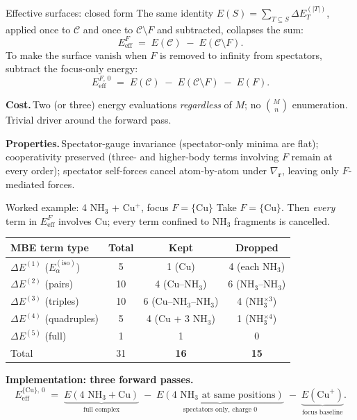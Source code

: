 \documentclass[aspectratio=169,11pt]{beamer}
\newcommand{\Eiso}{E^{(\mathrm{iso})}}
\begin{document}
\begin{frame}{Effective surfaces: closed form}
\small
The same identity $E(S)=\sum_{T\subseteq S}\Delta E^{(|T|)}_T$, applied once
to $\mathcal{C}$ and once to $\mathcal{C}\setminus F$ and subtracted,
collapses the sum:
\[
\boxed{\;E_{\mathrm{eff}}^{F}
\;=\;E(\mathcal{C})\;-\;E(\mathcal{C}\setminus F).\;}
\]
To make the surface vanish when $F$ is removed to infinity from spectators,
subtract the focus-only energy:
\[
E_{\mathrm{eff}}^{F,\,0}
\;=\;E(\mathcal{C})\;-\;E(\mathcal{C}\setminus F)\;-\;E(F).
\]

\textbf{Cost.}\,Two (or three) energy evaluations \emph{regardless} of $M$;
no $\binom{M}{n}$ enumeration. Trivial driver around the forward pass.

\textbf{Properties.}\,Spectator-gauge invariance (spectator-only minima are
flat); cooperativity preserved (three- and higher-body terms involving $F$
remain at every order); spectator self-forces cancel atom-by-atom under
$\nabla_{\mathbf r}$, leaving only $F$-mediated forces.
\end{frame}

\begin{frame}{Worked example: 4 NH$_3$ + Cu$^{+}$, focus $F=\{$Cu$\}$}
\footnotesize
Take $F=\{\text{Cu}\}$. Then \emph{every} term in $E_{\mathrm{eff}}^F$
involves Cu; every term confined to NH$_3$ fragments is cancelled.

\medskip
\centering
\renewcommand{\arraystretch}{1.05}
\begin{tabular}{l@{\;}c@{\;}c@{\;}c}
\toprule
MBE term type & Total & Kept & Dropped \\
\midrule
$\Delta E^{(1)}$  ($\Eiso_\alpha$)   & 5  & 1 (Cu)              & 4 (each NH$_3$) \\
$\Delta E^{(2)}$  (pairs)            & 10 & 4 (Cu--NH$_3$)      & 6 (NH$_3$--NH$_3$) \\
$\Delta E^{(3)}$  (triples)          & 10 & 6 (Cu--NH$_3$--NH$_3$) & 4 (NH$_3^{\times 3}$) \\
$\Delta E^{(4)}$  (quadruples)       & 5  & 4 (Cu + 3 NH$_3$)    & 1 (NH$_3^{\times 4}$) \\
$\Delta E^{(5)}$  (full)             & 1  & 1                    & 0 \\
\midrule
Total                                & 31 & \textbf{16}          & \textbf{15} \\
\bottomrule
\end{tabular}

\medskip
\flushleft
\textbf{Implementation: three forward passes.}
\[
E_{\mathrm{eff}}^{\{\text{Cu}\},\,0}
\;=\;\underbrace{E(\text{4 NH}_3+\text{Cu})}_{\text{full complex}}
\;-\;\underbrace{E(\text{4 NH}_3\text{ at same positions})}_{\text{spectators only, charge 0}}
\;-\;\underbrace{E(\text{Cu}^+)}_{\text{focus baseline}}.
\]
\end{frame}
\end{document}
